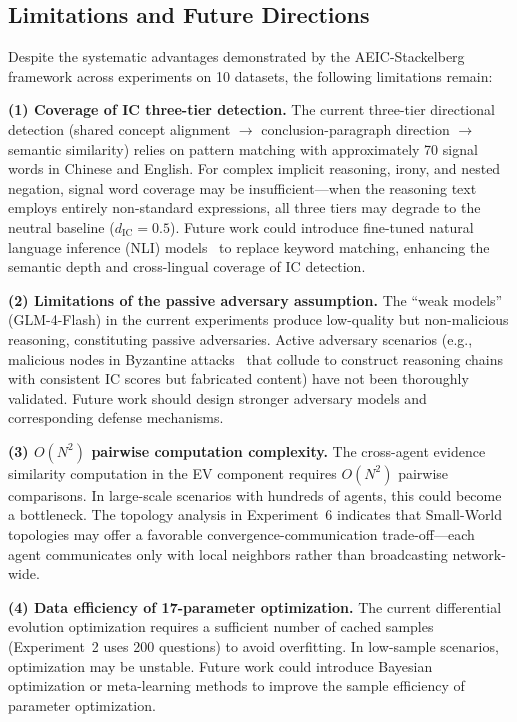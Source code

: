 \documentclass[12pt,a4paper]{article}
\begin{document}
\subsection{Limitations and Future Directions}

Despite the systematic advantages demonstrated by the AEIC-Stackelberg framework across experiments on 10 datasets, the following limitations remain:

\textbf{(1) Coverage of IC three-tier detection.} The current three-tier directional detection (shared concept alignment $\to$ conclusion-paragraph direction $\to$ semantic similarity) relies on pattern matching with approximately 70 signal words in Chinese and English. For complex implicit reasoning, irony, and nested negation, signal word coverage may be insufficient---when the reasoning text employs entirely non-standard expressions, all three tiers may degrade to the neutral baseline ($d_{\text{IC}} = 0.5$). Future work could introduce fine-tuned natural language inference (NLI) models~\cite{reimers2019sentence} to replace keyword matching, enhancing the semantic depth and cross-lingual coverage of IC detection.

\textbf{(2) Limitations of the passive adversary assumption.} The ``weak models'' (GLM-4-Flash) in the current experiments produce low-quality but non-malicious reasoning, constituting passive adversaries. Active adversary scenarios (e.g., malicious nodes in Byzantine attacks~\cite{olfati2007consensus} that collude to construct reasoning chains with consistent IC scores but fabricated content) have not been thoroughly validated. Future work should design stronger adversary models and corresponding defense mechanisms.

\textbf{(3) $O(N^2)$ pairwise computation complexity.} The cross-agent evidence similarity computation in the EV component requires $O(N^2)$ pairwise comparisons. In large-scale scenarios with hundreds of agents, this could become a bottleneck. The topology analysis in Experiment~6 indicates that Small-World topologies may offer a favorable convergence-communication trade-off---each agent communicates only with local neighbors rather than broadcasting network-wide.

\textbf{(4) Data efficiency of 17-parameter optimization.} The current differential evolution optimization requires a sufficient number of cached samples (Experiment~2 uses 200 questions) to avoid overfitting. In low-sample scenarios, optimization may be unstable. Future work could introduce Bayesian optimization or meta-learning methods to improve the sample efficiency of parameter optimization.
\end{document}
